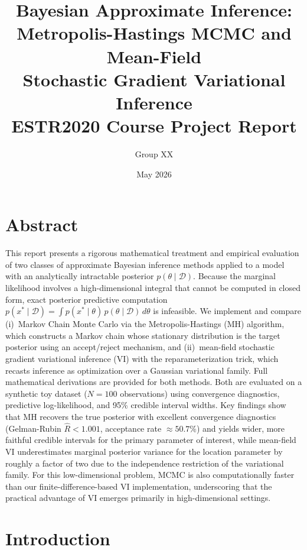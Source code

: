 \documentclass[12pt,a4paper]{article}
\title{%
  \textbf{Bayesian Approximate Inference: \\
  Metropolis-Hastings MCMC and Mean-Field\\
  Stochastic Gradient Variational Inference}\\[0.5em]
  \large ESTR2020 Course Project Report
}
\author{Group XX}
\date{May 2026}
\newcommand{\D}{\mathcal{D}}
\begin{document}
\maketitle
\tableofcontents
\newpage

\section{Abstract}

This report presents a rigorous mathematical treatment and empirical evaluation
of two classes of approximate Bayesian inference methods applied to a model
with an analytically intractable posterior $p(\theta \mid \D)$.
Because the marginal likelihood involves a high-dimensional integral that cannot
be computed in closed form, exact posterior predictive computation $p(x^* \mid \D) =
\int p(x^* \mid \theta)\,p(\theta \mid \D)\,d\theta$ is infeasible.
We implement and compare (i)~Markov Chain Monte Carlo via the
Metropolis-Hastings (MH) algorithm, which constructs a Markov chain whose
stationary distribution is the target posterior using an
accept/reject mechanism, and (ii)~mean-field stochastic gradient variational
inference (VI) with the reparameterization trick, which recasts inference as
optimization over a Gaussian variational family.
Full mathematical derivations are provided for both methods.
Both are evaluated on a synthetic toy dataset ($N=100$ observations)
using convergence diagnostics, predictive log-likelihood, and
95\% credible interval widths.
Key findings show that MH recovers the true posterior with excellent
convergence diagnostics (Gelman-Rubin $\hat{R} < 1.001$, acceptance
rate $\approx 50.7\%$) and yields wider, more faithful credible intervals
for the primary parameter of interest, while mean-field VI underestimates
marginal posterior variance for the location parameter by roughly a factor
of two due to the independence restriction of the variational family.
For this low-dimensional problem, MCMC is also computationally faster
than our finite-difference-based VI implementation, underscoring that
the practical advantage of VI emerges primarily in high-dimensional settings.

\newpage

\section{Introduction}
\end{document}
